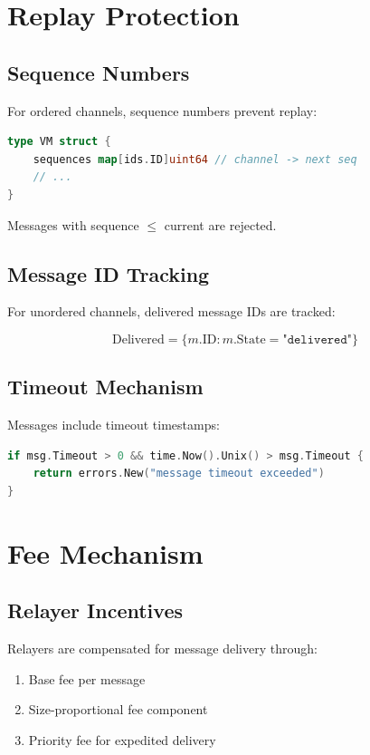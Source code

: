 \documentclass[11pt,twocolumn]{article}
\begin{document}
\section{Replay Protection}

\subsection{Sequence Numbers}

For ordered channels, sequence numbers prevent replay:

\begin{lstlisting}[language=Go,basicstyle=\ttfamily\small]
type VM struct {
    sequences map[ids.ID]uint64 // channel -> next seq
    // ...
}
\end{lstlisting}

Messages with sequence $\leq$ current are rejected.

\subsection{Message ID Tracking}

For unordered channels, delivered message IDs are tracked:

\begin{equation}
\text{Delivered} = \{m.\text{ID} : m.\text{State} = \texttt{"delivered"}\}
\end{equation}

\subsection{Timeout Mechanism}

Messages include timeout timestamps:

\begin{lstlisting}[language=Go,basicstyle=\ttfamily\small]
if msg.Timeout > 0 && time.Now().Unix() > msg.Timeout {
    return errors.New("message timeout exceeded")
}
\end{lstlisting}

\section{Fee Mechanism}

\subsection{Relayer Incentives}

Relayers are compensated for message delivery through:
\begin{enumerate}
\item Base fee per message
\item Size-proportional fee component
\item Priority fee for expedited delivery
\end{enumerate}
\end{document}
